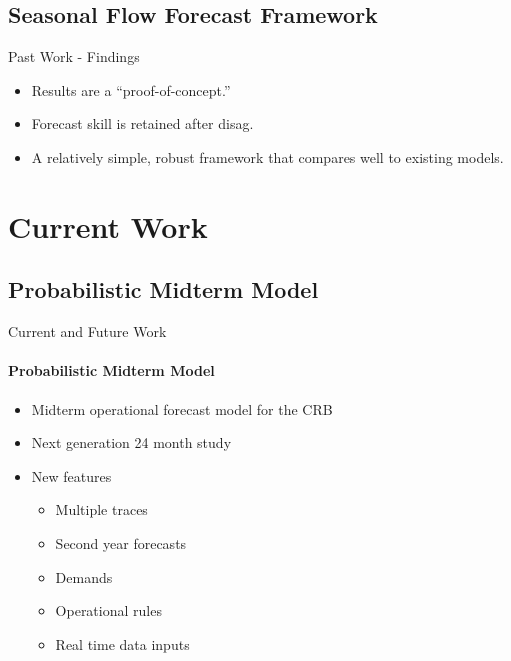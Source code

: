 \documentclass[compress]{beamer}
\begin{document}
\subsection{Seasonal Flow Forecast Framework}
\begin{frame}{Past Work - Findings}
%

\begin{figure}[htbp]
   \centering
\end{figure}


\begin{itemize}
\item Results are a ``proof-of-concept.''
\item Forecast skill is retained after disag.
\item A relatively simple, robust framework that compares well to existing models.
\end{itemize}

\end{frame}

\section{Current Work}
\subsection{Probabilistic Midterm Model}
\begin{frame}{Current and Future Work}
\framesubtitle{Probabilistic Midterm Model}
\pause
\begin{itemize}
\item Midterm operational forecast model for the CRB
\item Next generation 24 month study
\item New features
	\begin{itemize}
	\item Multiple traces
	\item Second year forecasts
	\item Demands 
	\item Operational rules
	\item Real time data inputs
	\end{itemize}
\end{itemize}

\end{frame}
\end{document}
